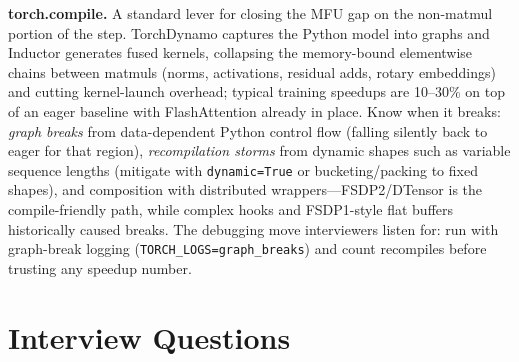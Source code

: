 \textbf{torch.compile.} A standard lever for closing the MFU gap on the non-matmul portion of the step. TorchDynamo captures the Python model into graphs and Inductor generates fused kernels, collapsing the memory-bound elementwise chains between matmuls (norms, activations, residual adds, rotary embeddings) and cutting kernel-launch overhead; typical training speedups are 10--30\% on top of an eager baseline with FlashAttention already in place. Know when it breaks: \emph{graph breaks} from data-dependent Python control flow (falling silently back to eager for that region), \emph{recompilation storms} from dynamic shapes such as variable sequence lengths (mitigate with \texttt{dynamic=True} or bucketing/packing to fixed shapes), and composition with distributed wrappers---FSDP2/DTensor is the compile-friendly path, while complex hooks and FSDP1-style flat buffers historically caused breaks. The debugging move interviewers listen for: run with graph-break logging (\texttt{TORCH\_LOGS=graph\_breaks}) and count recompiles before trusting any speedup number.

\section{Interview Questions}
\label{sec:training_interview}

